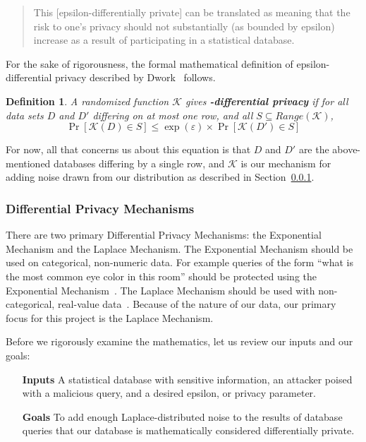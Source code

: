 \documentclass[conference,11pt]{IEEEtran}
\newtheorem{definition}{Definition}
\begin{document}
\blockquote{%
    This [epsilon-differentially private] can be translated as meaning that the
    risk to one's privacy should not substantially (as bounded by epsilon)
    increase as a result of participating in a statistical database.
}

For the sake of rigorousness, the formal mathematical definition of
epsilon-differential privacy described by Dwork~\cite{Dwork:2006:DP} follows.

\begin{mdframed}
    \begin{definition}
        A randomized function $\mathcal{K}$ gives
        \textbf{\textepsilon-differential privacy} if for all data sets $D$ and
        $D'$ differing on at most one row, and all $S \subseteq
        Range(\mathcal{K})$,
        \begin{equation}
            \Pr[\mathcal{K}(D) \in S] \leq \exp(\varepsilon) \times
            \Pr[\mathcal{K}(D') \in S]
        \end{equation}
    \end{definition}
\end{mdframed}

For now, all that concerns us about this equation is that $D$ and $D'$ are the
above-mentioned databases differing by a single row, and $\mathcal{K}$ is our
mechanism for adding noise drawn from our distribution as described in
Section~\ref{sec:dp-mech}.

\subsubsection{Differential Privacy Mechanisms}\label{sec:dp-mech}
There are two primary Differential Privacy Mechanisms: the Exponential Mechanism
and the Laplace Mechanism. The Exponential Mechanism should be used on
categorical, non-numeric data. For example queries of the form ``what is the
most common eye color in this room'' should be protected using the Exponential
Mechanism~\cite{Atockar:2014}. The Laplace Mechanism should be used with
non-categorical, real-value data~\cite{Geng:2014}. Because of the nature of our
data, our primary focus for this project is the Laplace Mechanism.

Before we rigorously examine the mathematics, let us review our inputs and our
goals:

\begin{itemize}[leftmargin=4em]
    \item [\textbf{Inputs}] A statistical database with sensitive information,
        an attacker poised with a malicious query, and a desired epsilon, or
        privacy parameter.

    \item [\textbf{Goals}] To add enough Laplace-distributed noise to the
        results of database queries that our database is mathematically
        considered differentially private.
\end{itemize}
\end{document}
